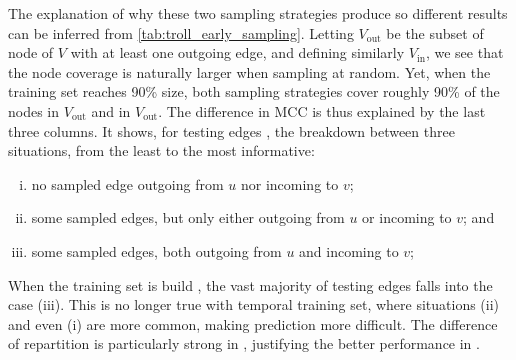 \begin{newcontent}
The explanation of
why these two sampling strategies produce so different results can be inferred from
\autoref{tab:troll_early_sampling}. Letting $V_{\mathrm{out}}$ be the subset of node of $V$ with at
least one outgoing edge, and defining similarly $V_{\mathrm{in}}$, we see that the node coverage is
naturally larger when sampling at random. Yet, when the training set reaches 90\% size, both
sampling strategies cover roughly 90\% of the nodes in $V_{\mathrm{out}}$ and in
$V_{\mathrm{out}}$. The difference in MCC is thus explained by the last three columns. It shows, for
testing edges \euv{}, the breakdown between three situations, from the least to the most
informative:
\begin{enumerate}[(i),nosep]
  \item no sampled edge outgoing from $u$ nor incoming to $v$;
  \item some sampled edges, but only either outgoing from $u$ or incoming to $v$; and
  \item some sampled edges, both outgoing from $u$ and incoming to $v$;
\end{enumerate}
When the training set is build \uar{}, the vast majority of testing edges falls into the case (iii).
This is no longer true with temporal training set, where situations (ii) and even (i) are more
common, making prediction more difficult. The difference of repartition is particularly strong in
\wik{}, justifying the better performance in \epi{}.



\end{newcontent}
